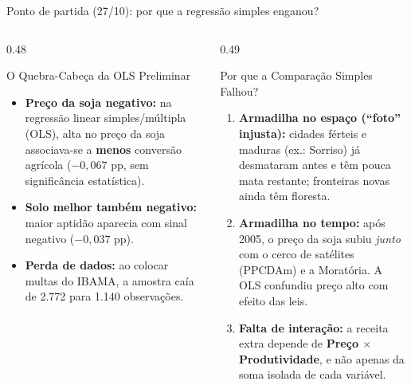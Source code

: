 \documentclass[aspectratio=169,10.5pt]{beamer}
\newcommand{\fonte}[1]{\par\vspace{1mm}{\fontsize{6.5}{7.5}\selectfont\color{gray}Fonte: #1\par}}
\newcommand{\est}[2]{\ensuremath{#1}\;{\color{gray}\fontsize{7}{8}\selectfont(#2)}}
\begin{document}
\begin{frame}{Ponto de partida (27/10): por que a regressão simples enganou?}
\begin{columns}[T]
\begin{column}{0.48\textwidth}
\begin{block}{O Quebra-Cabeça da OLS Preliminar}
\fontsize{8.2}{10}\selectfont
\begin{itemize}
    \setlength{\itemsep}{1.1mm}
    \item \textbf{Preço da soja negativo:} na regressão linear simples/múltipla (OLS), alta no preço da soja associava-se a \textbf{menos} conversão agrícola (\est{-0{,}067}{0{,}067} pp, sem significância estatística).
    \item \textbf{Solo melhor também negativo:} maior aptidão aparecia com sinal negativo (\est{-0{,}037}{0{,}022} pp).
    \item \textbf{Perda de dados:} ao colocar multas do IBAMA, a amostra caía de 2.772 para 1.140 observações.
\end{itemize}
\end{block}
\end{column}

\begin{column}{0.49\textwidth}
\begin{block}{Por que a Comparação Simples Falhou?}
\fontsize{8.2}{10}\selectfont
\begin{enumerate}
    \setlength{\itemsep}{1.1mm}
    \item \textbf{Armadilha no espaço (``foto'' injusta):} cidades férteis e maduras (ex.: Sorriso) já desmataram antes e têm pouca mata restante; fronteiras novas ainda têm floresta.
    \item \textbf{Armadilha no tempo:} após 2005, o preço da soja subiu \textit{junto} com o cerco de satélites (PPCDAm) e a Moratória. A OLS confundiu preço alto com efeito das leis.
    \item \textbf{Falta de interação:} a receita extra depende de \textbf{Preço $\times$ Produtividade}, e não apenas da soma isolada de cada variável.
\end{enumerate}
\end{block}
\end{column}
\end{columns}
\end{frame}
\end{document}

